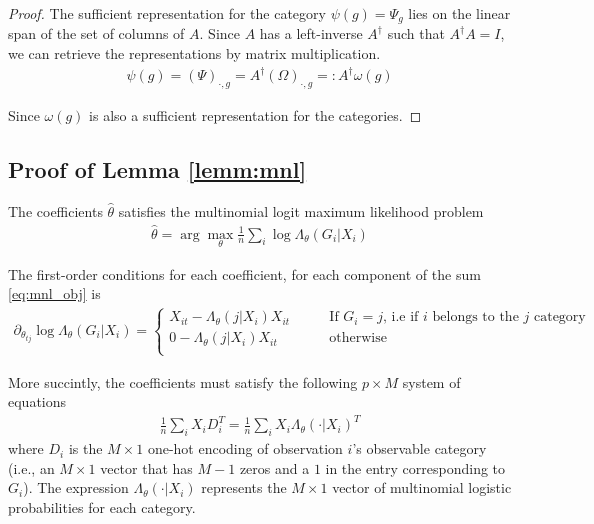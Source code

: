 \documentclass{article}
\theoremstyle{plain}
\theoremstyle{definition}
\theoremstyle{remark}
\begin{document}
\begin{proof}
The sufficient representation for the category $\psi(g) = \Psi_{g}$ lies on the linear span of the set of columns of $A$. Since $A$ has a left-inverse $A^\dagger$ such that $A^\dagger A = I$, we can retrieve the representations by matrix multiplication.
\begin{align}
    \psi(g) = (\Psi)_{\cdot, g} = A^\dagger(\Omega)_{\cdot, g} =: A^\dagger \omega(g)
    \label{eq:omega_inverse}
\end{align}

Since $\omega(g)$ is also a sufficient representation for the categories.
\end{proof}

\subsection{Proof of Lemma \ref{lemm:mnl}}

The coefficients $\hat{\theta}$ satisfies the multinomial logit maximum likelihood problem
\begin{align}
  \hat{\theta} = \arg\max_{\theta} \frac{1}{n} \sum_{i} \log \Lambda_{\theta}(G_{i}| X_{i})
  \label{eq:mnl_obj}
\end{align}




\noindent The first-order conditions for each coefficient, for each component of the sum \eqref{eq:mnl_obj} is
\begin{align}
  \partial_{\theta_{tj}} \log \Lambda_{\theta}(G_{i} | X_{i}) =
  \begin{cases}
      X_{it} - \Lambda_{\theta}(j | X_{i})X_{it} \qquad &\text{If $G_{i} = j$, i.e if $i$ belongs to the $j$ category} \\
      0 - \Lambda_{\theta}(j | X_{i})X_{it} \qquad &\text{otherwise} \\
  \end{cases}
\end{align}

\noindent More succintly, the coefficients must satisfy the following $p \times M$ system of equations
\begin{align}
  \frac{1}{n}\sum_{i} X_{i} D_{i}^{T} = \frac{1}{n} \sum_{i}X_{i}\Lambda_{\theta}(\cdot |X_{i})^{T}
  \label{eq:mnl_foc1}
\end{align}
\noindent where $D_{i}$ is the $M \times 1$ one-hot encoding of observation $i$'s observable category (i.e., an $M \times 1$ vector that has $M-1$ zeros and a $1$ in the entry corresponding to $G_{i}$). The expression $\Lambda_{\theta}(\cdot|X_{i})$ represents the $M \times 1$ vector of multinomial logistic probabilities for each category.
\end{document}
